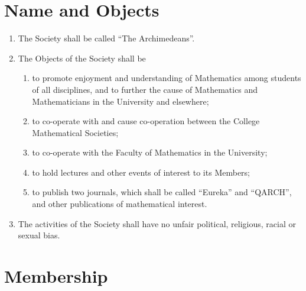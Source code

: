 \documentclass{article}
\begin{document}
\section{Name and Objects}

\begin{enumerate}
\item The Society shall be called ``The Archimedeans''.
\item The Objects of the Society shall be
  \begin{enumerate}
  \item to promote enjoyment and understanding of Mathematics among students of all disciplines, and to further the cause of Mathematics and
  Mathematicians in the University and elsewhere;
  \item to co-operate with and cause co-operation between the College Mathematical Societies;
  \item to co-operate with the Faculty of Mathematics in the University;
  \item to hold lectures and other events of interest to its Members;
  \item to publish two journals, which shall be called ``Eureka'' and ``QARCH'',
  and other publications of mathematical interest.
  \end{enumerate}
\item The activities of the Society shall have no unfair political, religious, racial
or sexual bias.
\end{enumerate}


\section{Membership}
\end{document}
